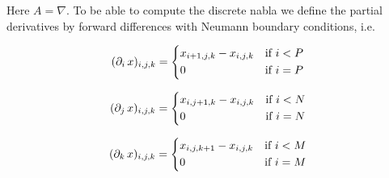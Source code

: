                 \begin{describe}
                    Here $A = \nabla$. To be able to compute the discrete nabla we define the partial derivatives by forward differences with Neumann boundary conditions, i.e.
                    \begin{center}
                        \begin{minipage}{0.4\textwidth}
                            \[
                                (\partial_{i}\,x)_{i, j, k} =
                                    \begin{dcases*}
                                        x_{i+1, j, k} - x_{i, j, k} & \textnormal{if $i < P$}\\
                                        0 & \textnormal{if $i = P$}
                                    \end{dcases*}
                            \]
                        \end{minipage}\hspace{1cm}
                        \begin{minipage}{0.4\textwidth}
                            \[
                                (\partial_{j}\,x)_{i, j, k} =
                                    \begin{dcases*}
                                        x_{i, j+1, k} - x_{i, j, k} & \textnormal{if $i < N$}\\
                                        0 & \textnormal{if $i = N$}
                                    \end{dcases*}
                            \]
                        \end{minipage}
                    \end{center}
                    \begin{center}
                        \begin{minipage}{0.5\textwidth}
                            \[
                                (\partial_{k}\,x)_{i, j, k} =
                                    \begin{dcases*}
                                        x_{i, j, k+1} - x_{i, j, k} & \textnormal{if $i < M$}\\
                                        0 & \textnormal{if $i = M$}
                                    \end{dcases*}
                            \]
                        \end{minipage}
                    \end{center}
                \end{describe}

